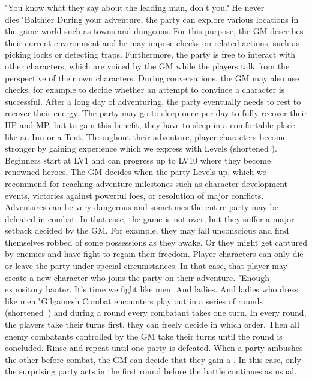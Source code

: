 %
\newpage
%
%
%
\vfill
%
%
{"You know what they say about the leading man, don't you? He never dies."}{Balthier}{
During your adventure, the party can explore various locations in the game world such as towns and dungeons.
For this purpose, the GM describes their current environment and he may impose checks on related actions, such as picking locks or detecting traps.
Furthermore, the party is free to interact with other characters, which are voiced by the GM while the players talk from the perspective of their own characters.
During conversations, the GM may also use checks, for example to decide whether an attempt to convince a character is successful.
After a long day of adventuring, the party eventually needs to rest to recover their energy.
The party may go to sleep once per day to fully recover their HP and MP, but to gain this benefit, they have to sleep in a comfortable place like an Inn or a Tent.
Throughout their adventure, player characters become stronger by gaining experience which we express with Levels (shortened ).
Beginners start at LV1 and can progress up to LV10 where they become renowned heroes. 
The GM decides when the party Levels up, which we recommend for reaching adventure milestones such as character development events, victories against powerful foes, or resolution of major conflicts. 
Adventures can be very dangerous and sometimes the entire party may be defeated in combat.
In that case, the game is not over, but they suffer a major setback decided by the GM.
For example, they may fall unconscious and find themselves robbed of some possessions as they awake.
Or they might get captured by enemies and have fight to regain their freedom.
Player characters can only die or leave the party under special circumstances.
In that case, that player may create a new character who joins the party on their adventure.}
%
%
%
%
%
\vfill
%
{"Enough expository banter. It's time we fight like men. And ladies. And ladies who dress like men."}{Gilgamesh}{
Combat encounters play out in a series of rounds (shortened~) and during a round every combatant takes one turn.
In every round, the players take their turns first, they can freely decide in which order.
Then all enemy combatants controlled by the GM take their turns until the round is concluded.
Rinse and repeat until one party is defeated.
When a party ambushes the other before combat, the GM can decide that they gain a .
In this case, only the surprising party acts in the first round before the battle continues as usual.}
